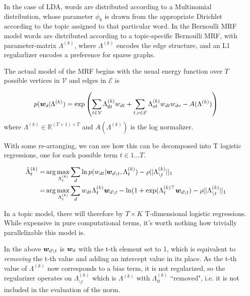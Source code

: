 In the case of LDA, words are distributed according to a Multinomial distribution, whose parameter $\phi_k$ is drawn from the appropriate Dirichlet according to the topic assigned to that particular word. In the Bernoulli MRF model words are distributed according to a topic-specific Bernoulli MRF, with parameter-matrix $\Lambda^{(k)}$, where $\Lambda^{(k)}$ encodes the edge structure, and an L1 regularlizer encodes a preference for sparse graphs.

\newcommand \vertices { { \mathcal{V} } }
\newcommand \edges    { { \mathcal{E} } }

The actual model of the MRF begins with the usual energy function over $T$ possible vertices in $\vertices$ and edges in $\edges$ is

\begin{equation}
p(\vv{w}_d|\Lambda^{(k)}) = \exp\left(
    \sum_{t\in\vertices}\Lambda^{(k)}_{\emptyset t} w_{dt}
    + \sum_{t,v \in \edges}\Lambda^{(k)}_{st} w_{dt} w_{dv}
    - A(\Lambda^{(k)})
\right)
\end{equation}
where $\Lambda^{(k)} \in \mathbb{R}^{(T+1) \times T}$ and $A(\Lambda^{(k)})$ is the log normalizer. 

With some re-arranging, we can see how this can be decomposed into T logistic regressions, one for each possible term $t \in {1\ldots T}$. 

\begin{align}
\hat{\Lambda}^{(k)}_t = & \arg \max_{\Lambda^{(k)}_t} \sum_d \ln p(w_{dt}|\bm w_{d \setminus t}, \Lambda^{(k)}_t) - \rho ||\Lambda^{(k)}_{\setminus t}||_1 \\
 = &  \arg \max_{\Lambda^{(k)}_t} \sum_d w_{dt} \Lambda^{(k)}_t \bm w_{d \setminus t} - \ln(1 + \exp(\Lambda_t^{(k)\top}\bm w_{d \setminus t}) - \rho ||\Lambda^{(k)}_{\setminus t}||_1
\end{align}

In a topic model, there will therefore by $T \times K$ T-dimensional logistic regressions. While expensive in pure computational terms, it's worth nothing how trivially parallelizable this model is.

In the above $\bm w_{d \setminus t}$ is $\bm w_d$ with the t-th element set to 1, which is equivalent to \emph{removing} the t-th value and adding an intercept value in its place. As the t-th value of $\Lambda^{(k)}$ now corresponds to a bias term, it is not regularized, so the regularizer operates on $\Lambda^{(k)}_{\setminus t}$ which is $\Lambda^{(k)}$ with $\Lambda^{(k)}_{tt}$ ``removed", i.e. it is not included in the evaluation of the norm.

